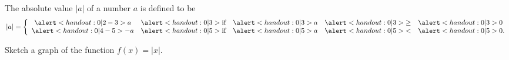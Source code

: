 \begin{frame}
\begin{example} %
The absolute value $|a|$ of a number $a$ is defined to be
\[
|a| = \left\{ \begin{array}{ccccl}
\alert<handout:0| 2-3>{a} & \alert<handout:0| 3>{\textrm{if}} & \alert<handout:0| 3>{ a} & \alert<handout:0| 3>{\geq} & \alert<handout:0| 3>{0} \\
\alert<handout:0| 4-5>{-a} & \alert<handout:0| 5>{\textrm{if}} &  \alert<handout:0| 5>{a} & \alert<handout:0| 5>{<} & \alert<handout:0| 5>{0}. \end{array}\right.
\]

Sketch a graph of the function $f(x) = |x|$.

\begin{center}
\ %
%
%
\end{center}
\end{example}
\end{frame}

